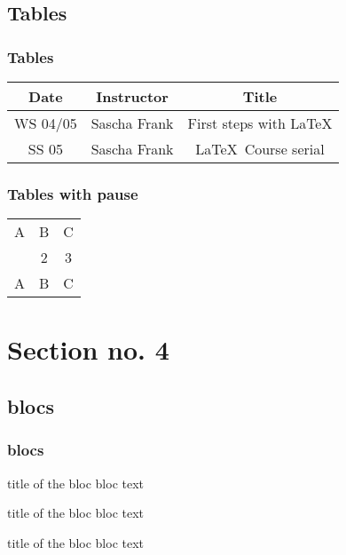 \documentclass[hyperref]{beamer}
\begin{document}
\subsection{Tables}
\begin{frame}
\frametitle{Tables}
\begin{tabular}{|c|c|c|}
\hline
\textbf{Date} & \textbf{Instructor} & \textbf{Title} \\
\hline
WS 04/05 & Sascha Frank & First steps with  \LaTeX  \\
\hline
SS 05 & Sascha Frank & \LaTeX \ Course serial \\
\hline
\end{tabular}
\end{frame}

\begin{frame}
\frametitle{Tables with pause}
\begin{tabular}{c c c}
A & B & C \\ 
\pause 
1 & 2 & 3 \\  
\pause 
A & B & C \\ 
\end{tabular} 
\end{frame}

\section{Section no. 4}
\subsection{blocs}
\begin{frame}
\frametitle{blocs}

\begin{block}{title of the bloc}
bloc text
\end{block}

\begin{exampleblock}{title of the bloc}
bloc text
\end{exampleblock}

\begin{alertblock}{title of the bloc}
bloc text
\end{alertblock}
\end{frame}
\end{document}
